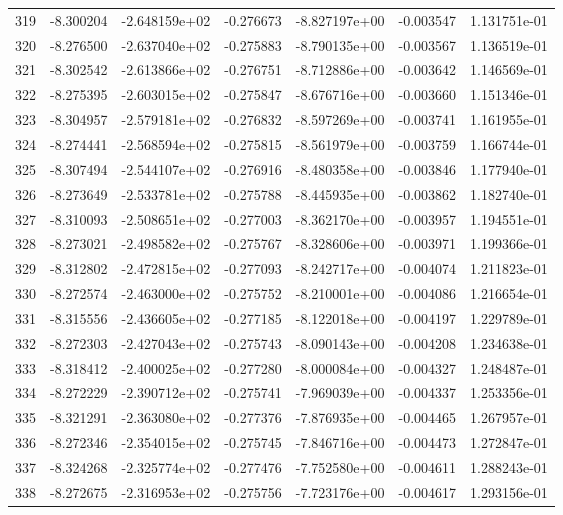 \begin{tabular}{rrrrrrr}
 319 &  -8.300204 & -2.648159e+02 & -0.276673 & -8.827197e+00 &  -0.003547 &  1.131751e-01 \\
 320 &  -8.276500 & -2.637040e+02 & -0.275883 & -8.790135e+00 &  -0.003567 &  1.136519e-01 \\
 321 &  -8.302542 & -2.613866e+02 & -0.276751 & -8.712886e+00 &  -0.003642 &  1.146569e-01 \\
 322 &  -8.275395 & -2.603015e+02 & -0.275847 & -8.676716e+00 &  -0.003660 &  1.151346e-01 \\
 323 &  -8.304957 & -2.579181e+02 & -0.276832 & -8.597269e+00 &  -0.003741 &  1.161955e-01 \\
 324 &  -8.274441 & -2.568594e+02 & -0.275815 & -8.561979e+00 &  -0.003759 &  1.166744e-01 \\
 325 &  -8.307494 & -2.544107e+02 & -0.276916 & -8.480358e+00 &  -0.003846 &  1.177940e-01 \\
 326 &  -8.273649 & -2.533781e+02 & -0.275788 & -8.445935e+00 &  -0.003862 &  1.182740e-01 \\
 327 &  -8.310093 & -2.508651e+02 & -0.277003 & -8.362170e+00 &  -0.003957 &  1.194551e-01 \\
 328 &  -8.273021 & -2.498582e+02 & -0.275767 & -8.328606e+00 &  -0.003971 &  1.199366e-01 \\
 329 &  -8.312802 & -2.472815e+02 & -0.277093 & -8.242717e+00 &  -0.004074 &  1.211823e-01 \\
 330 &  -8.272574 & -2.463000e+02 & -0.275752 & -8.210001e+00 &  -0.004086 &  1.216654e-01 \\
 331 &  -8.315556 & -2.436605e+02 & -0.277185 & -8.122018e+00 &  -0.004197 &  1.229789e-01 \\
 332 &  -8.272303 & -2.427043e+02 & -0.275743 & -8.090143e+00 &  -0.004208 &  1.234638e-01 \\
 333 &  -8.318412 & -2.400025e+02 & -0.277280 & -8.000084e+00 &  -0.004327 &  1.248487e-01 \\
 334 &  -8.272229 & -2.390712e+02 & -0.275741 & -7.969039e+00 &  -0.004337 &  1.253356e-01 \\
 335 &  -8.321291 & -2.363080e+02 & -0.277376 & -7.876935e+00 &  -0.004465 &  1.267957e-01 \\
 336 &  -8.272346 & -2.354015e+02 & -0.275745 & -7.846716e+00 &  -0.004473 &  1.272847e-01 \\
 337 &  -8.324268 & -2.325774e+02 & -0.277476 & -7.752580e+00 &  -0.004611 &  1.288243e-01 \\
 338 &  -8.272675 & -2.316953e+02 & -0.275756 & -7.723176e+00 &  -0.004617 &  1.293156e-01 \\

\end{tabular}
